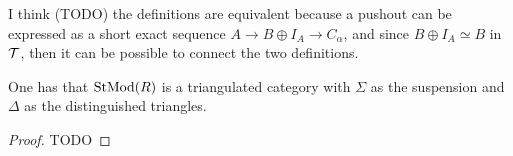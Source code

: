 \begin{remark}
    I think (TODO) the definitions are equivalent because a pushout can be expressed as a short exact sequence \( A \to B \oplus I_A \to C_\alpha \), and since \( B \oplus I_A \simeq B \) in \( {\mathcal{T}} \), then it can be possible to connect the two definitions. 
\end{remark}

\begin{theorem}
    One has that \( \operatorname{StMod}(R) \) is a triangulated category with \( \Sigma \) as the suspension and \( \Delta \) as the distinguished triangles.
\end{theorem}
\begin{proof}
    TODO
\end{proof}
